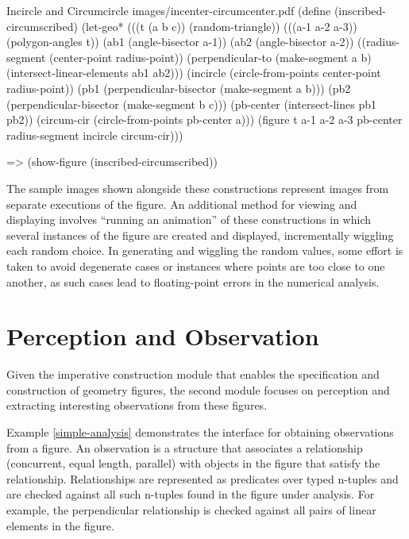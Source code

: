 \begin{pdf-example}
[label=incircle-circumcircle-fig]
{Incircle and Circumcircle}
{images/incenter-circumcenter.pdf}
(define (inscribed-circumscribed)
  (let-geo* (((t (a b c)) (random-triangle))
             (((a-1 a-2 a-3)) (polygon-angles t))
             (ab1 (angle-bisector a-1))
             (ab2 (angle-bisector a-2))
             ((radius-segment (center-point radius-point))
              (perpendicular-to (make-segment a b)
                                (intersect-linear-elements ab1 ab2)))
             (incircle (circle-from-points
                        center-point
                        radius-point))
             (pb1 (perpendicular-bisector
                   (make-segment a b)))
             (pb2 (perpendicular-bisector
                   (make-segment b c)))
             (pb-center (intersect-lines pb1 pb2))
             (circum-cir (circle-from-points
                          pb-center
                          a)))
    (figure t a-1 a-2 a-3
            pb-center
            radius-segment
            incircle
            circum-cir)))

=> (show-figure (inscribed-circumscribed))
\end{pdf-example}

The sample images shown alongside these constructions represent images
from separate executions of the figure. An additional method for
viewing and displaying involves ``running an animation'' of these
constructions in which several instances of the figure are created and
displayed, incrementally wiggling each random choice. In generating
and wiggling the random values, some effort is taken to avoid
degenerate cases or instances where points are too close to one
another, as such cases lead to floating-point errors in the numerical
analysis.

\section{Perception and Observation}

Given the imperative construction module that enables the
specification and construction of geometry figures, the second module
focuses on perception and extracting interesting observations from
these figures.

Example \ref{simple-analysis} demonstrates the interface for obtaining
observations from a figure. An observation is a structure that
associates a relationship (concurrent, equal length, parallel) with
objects in the figure that satisfy the relationship. Relationships are
represented as predicates over typed n-tuples and are checked against
all such n-tuples found in the figure under analysis. For example, the
perpendicular relationship is checked against all pairs of linear elements
in the figure.

